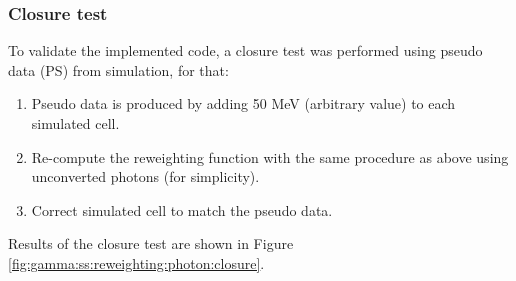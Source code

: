 \begin{figure}[htbp]
\end{figure}

\subsubsection{Closure test}
To validate the implemented code, a closure test was performed using pseudo data (PS) from simulation, for that:
\begin{enumerate}
    \item Pseudo data is produced by adding 50 MeV (arbitrary value) to each simulated cell.
    \item Re-compute the reweighting function with the same procedure as above using unconverted photons (for simplicity).
    \item Correct simulated cell to match the pseudo data.
\end{enumerate}
Results of the closure test are shown in Figure \ref{fig:gamma:ss:reweighting:photon:closure}. 

